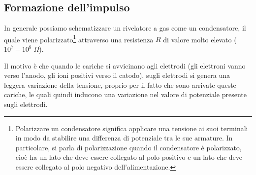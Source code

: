 \subsection{Formazione dell'impulso}
In generale possiamo schematizzare un rivelatore a gas come un condensatore, il quale viene polarizzato\footnote{Polarizzare un condensatore significa applicare una tensione ai suoi terminali in modo da stabilire una differenza di potenziale tra le sue armature. In particolare, si parla di polarizzazione quando il condensatore è polarizzato, cioè ha un lato che deve essere collegato al polo positivo e un lato che deve essere collegato al polo negativo dell'alimentazione.} attraverso una resistenza $R$ di valore molto elevato ($10^7-10^8 \; \Omega$).

\vspace{-0.1cm}

\begin{minipage}{0.395\textwidth}
   \begin{figure}[H]
      \centering
   \end{figure}
\end{minipage}
\begin{minipage}{0.6\textwidth}
   \vspace{0.5cm}Il motivo è che quando le cariche si avvicinano agli elettrodi (gli elettroni vanno verso l'anodo, gli ioni positivi verso il catodo), sugli elettrodi si genera una leggera variazione della tensione, proprio per il fatto che sono arrivate queste cariche, le quali quindi inducono una variazione nel valore di potenziale presente sugli elettrodi.
\end{minipage}

